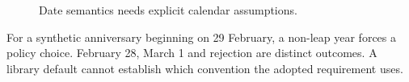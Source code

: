 \begin{figure}[H]
\centering
{}
\caption{Date semantics needs explicit calendar assumptions.}\label{fig:teach-P-02-literature-03}
\end{figure}

For a synthetic anniversary beginning on 29 February, a non-leap year forces a policy choice. February 28, March 1 and rejection are distinct outcomes. A library default cannot establish which convention the adopted requirement uses.

